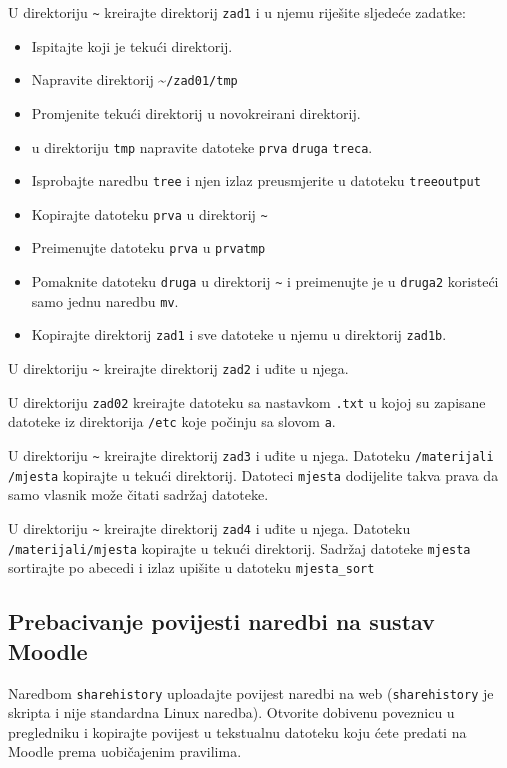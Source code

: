 \begin{zadatak} U direktoriju \texttt{\textasciitilde}  kreirajte direktorij \texttt{zad1} i u njemu riješite sljedeće zadatke:
	\begin{itemize}
		\item Ispitajte koji je tekući direktorij.
		\item Napravite direktorij \textasciitilde \texttt{/zad01/tmp}
		\item Promjenite tekući direktorij u novokreirani direktorij.
		\item u direktoriju \texttt{tmp} napravite datoteke \texttt{prva} \texttt{druga} \texttt{treca}.
		\item Isprobajte naredbu \texttt{tree} i njen izlaz preusmjerite u datoteku \texttt{treeoutput}
		\item Kopirajte datoteku \texttt{prva} u direktorij  \texttt{\textasciitilde}
		\item Preimenujte datoteku \texttt{prva} u \texttt{prvatmp}
		\item Pomaknite datoteku \texttt{druga} u direktorij  \texttt{\textasciitilde} i preimenujte je u \texttt{druga2} koristeći samo jednu naredbu \texttt{mv}.
		\item Kopirajte direktorij \texttt{zad1} i sve datoteke u njemu u direktorij \texttt{zad1b}.
	\end{itemize}
\end{zadatak}


\begin{zadatak} 
	U direktoriju \texttt{\textasciitilde} kreirajte direktorij \texttt{zad2} i uđite u njega.
		\item U direktoriju \texttt{zad02} kreirajte datoteku sa nastavkom \texttt{.txt} u kojoj su zapisane datoteke iz direktorija \texttt{/etc} koje počinju sa slovom \texttt{a}.
		
\end{zadatak}

\begin{zadatak}
	U direktoriju \texttt{\textasciitilde} kreirajte direktorij \texttt{zad3}  i uđite u njega. Datoteku \texttt{/materijali /mjesta} kopirajte u tekući direktorij. Datoteci \texttt{mjesta} dodijelite takva prava da samo vlasnik može čitati sadržaj datoteke.
\end{zadatak}

\begin{zadatak}
	U direktoriju \texttt{\textasciitilde}  kreirajte direktorij \texttt{zad4} i uđite u njega. Datoteku \texttt{/materijali/mjesta} kopirajte u tekući direktorij. Sadržaj datoteke \texttt{mjesta} sortirajte po abecedi i izlaz upišite u datoteku \texttt{mjesta\_sort} 
\end{zadatak}

\subsection*{Prebacivanje povijesti naredbi na sustav Moodle}

Naredbom \texttt{sharehistory} uploadajte povijest naredbi na web (\texttt{sharehistory} je skripta i nije standardna Linux naredba). Otvorite dobivenu poveznicu u pregledniku i kopirajte povijest u tekstualnu datoteku koju ćete predati na Moodle prema uobičajenim pravilima.
